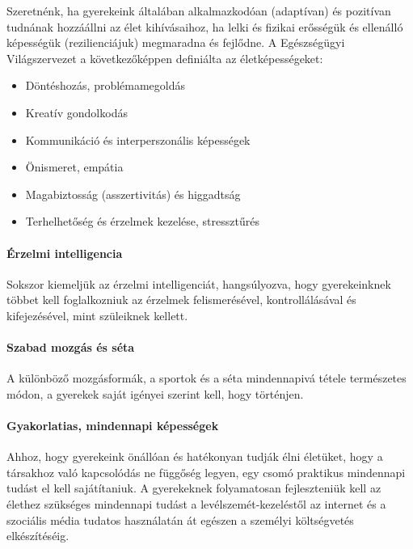 Szeretnénk, ha gyerekeink általában alkalmazkodóan (adaptívan) és
pozitívan tudnának hozzáállni az élet kihívásaihoz, ha lelki és fizikai
erősségük és ellenálló képességük (rezilienciájuk) megmaradna és
fejlődne. A Egészségügyi Világszervezet {\autocite{WHO1999}} a
következőképpen definiálta az életképességeket:

\begin{itemize}
\tightlist
\item
  Döntéshozás, problémamegoldás
\item
  Kreatív gondolkodás
\item
  Kommunikáció és interperszonális képességek
\item
  Önismeret, empátia
\item
  Magabiztosság (asszertivitás) és higgadtság
\item
  Terhelhetőség és érzelmek kezelése, stressztűrés
\end{itemize}

\vspace*{-1ex}
\hypertarget{erzelmi-intelligencia}{%
\paragraph{Érzelmi intelligencia}\label{erzelmi-intelligencia}}

Sokszor kiemeljük az érzelmi intelligenciát, hangsúlyozva, hogy
gyerekeinknek többet kell foglalkozniuk az érzelmek felismerésével,
kontrollálásával és kifejezésével, mint szüleiknek kellett.

\vspace*{-1ex}
\hypertarget{szabad-mozgas-es-seta}{%
\paragraph{Szabad mozgás és séta}\label{szabad-mozgas-es-seta}}

A különböző mozgásformák, a sportok és a séta mindennapivá tétele
természetes módon, a gyerekek saját igényei szerint kell, hogy történjen.

\vspace*{-1ex}
\hypertarget{gyakorlatias-mindennapi-kepessegek}{%
\paragraph{Gyakorlatias, mindennapi
képességek}\label{gyakorlatias-mindennapi-kepessegek}}

Ahhoz, hogy gyerekeink önállóan és hatékonyan tudják élni életüket, hogy
a társakhoz való kapcsolódás ne függőség legyen, egy csomó praktikus
mindennapi tudást el kell sajátítaniuk. A gyerekeknek folyamatosan
fejleszteniük kell az élethez szükséges mindennapi tudást a
levélszemét-kezeléstől az internet és a szociális média tudatos
használatán át egészen a személyi költségvetés elkészítéséig.

